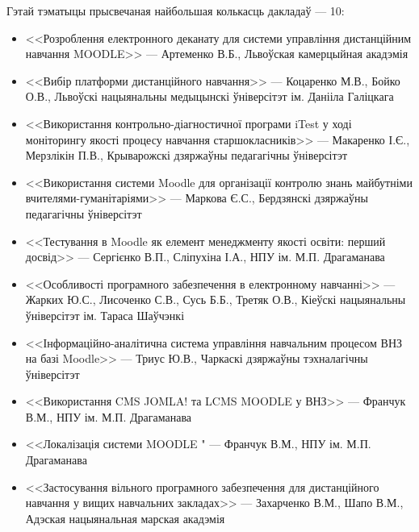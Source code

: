 \documentclass[10pt, a5paper]{article}
\begin{document}
Гэтай тэматыцы прысвечаная найбольшая колькасць дакладаў --- 10:
\begin{itemize}
\item <<Розроблення електронного деканату для системи управління дистанційним навчання MOODLE>> --- Артеменко В.Б., Львоўская камерцыйная акадэмія
\item <<Вибір платформи дистанційного навчання>> --- Коцаренко М.В., Бойко О.В.,  Львоўскі нацыянальны медыцынскі ўніверсітэт ім. Данііла Галіцкага
\item <<Використання контрольно-діагностичної програми iTest у ході моніторингу якості процесу навчання старшокласників>> --- Макаренко І.Є., Мерзлікін П.В., Крыварожскі дзяржаўны педагагічны ўніверсітэт
\item  <<Використання системи Moodle для організації контролю знань майбутніми вчителями-гуманітаріями>> --- Маркова Є.С., Бердзянскі дзяржаўны педагагічны ўніверсітэт
\item  <<Тестування в  Moodle як елемент менеджменту якості освіти: перший досвід>> --- Сергієнко В.П., Сліпухіна І.А., НПУ ім. М.П. Драгаманава
\item  <<Особливості програмного забезпечення в електронному навчанні>> --- Жарких Ю.С., Лисоченко С.В., Сусь Б.Б., Третяк О.В., Кіеўскі нацыянальны ўніверсітэт ім. Тараса Шаўчэнкі
\item  <<Інформаційно-аналітична система управління навчальним процесом ВНЗ на базі  Moodle>> --- Триус Ю.В., Чаркаскі дзяржаўны тэхналагічны ўніверсітэт
\item  <<Використання CMS JOMLA!  та LCMS MOODLE у ВНЗ>> --- Франчук В.М., НПУ ім. М.П. Драгаманава
\item <<Локалізація системи MOODLE " --- Франчук В.М., НПУ ім. М.П. Драгаманава
\item  <<Застосування вільного програмного забезпечення для дистанційного навчання у вищих навчальних закладах>> --- Захарченко В.М., Шапо В.М., Адэская нацыянальная марская акадэмія
\end{itemize}
\end{document}
